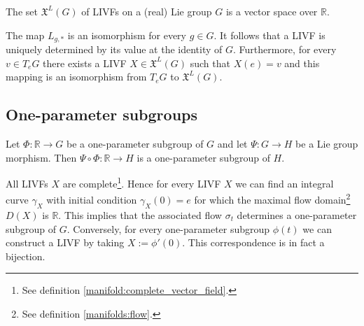     \begin{property}
        The set $\mathfrak{X}^L(G)$ of LIVFs on a (real) Lie group $G$ is a vector space over $\mathbb{R}$.
    \end{property}
    \begin{property}\label{lie:livf_prop}
        The map $L_{g,\ast}$ is an isomorphism for every $g\in G$. It follows that a LIVF is uniquely determined by its value at the identity of $G$. Furthermore, for every $v\in T_eG$ there exists a LIVF $X\in\mathfrak{X}^L(G)$ such that $X(e)=v$ and this mapping is an isomorphism from $T_eG$ to $\mathfrak{X}^L(G)$.
    \end{property}

\subsection{One-parameter subgroups}

    \begin{property}\label{group:OPS_composition}
        Let $\Phi:\mathbb{R}\rightarrow G$ be a one-parameter subgroup of $G$ and let $\Psi:G\rightarrow H$ be a Lie group morphism. Then $\Psi\circ\Phi:\mathbb{R}\rightarrow H$ is a one-parameter subgroup of $H$.
    \end{property}

    \begin{property}\label{lie:livf_subgroup}
        All LIVFs $X$ are complete\footnote{See definition \ref{manifold:complete_vector_field}.}. Hence for every LIVF $X$ we can find an integral curve $\gamma_X$ with initial condition $\gamma_X(0) = e$ for which the maximal flow domain\footnote{See definition \ref{manifolds:flow}.} $D(X)$ is $\mathbb{R}$. This implies that the associated flow $\sigma_t$ determines a one-parameter subgroup of $G$. Conversely, for every one-parameter subgroup $\phi(t)$ we can construct a LIVF by taking $X := \phi'(0)$. This correspondence is in fact a bijection.
    \end{property}


